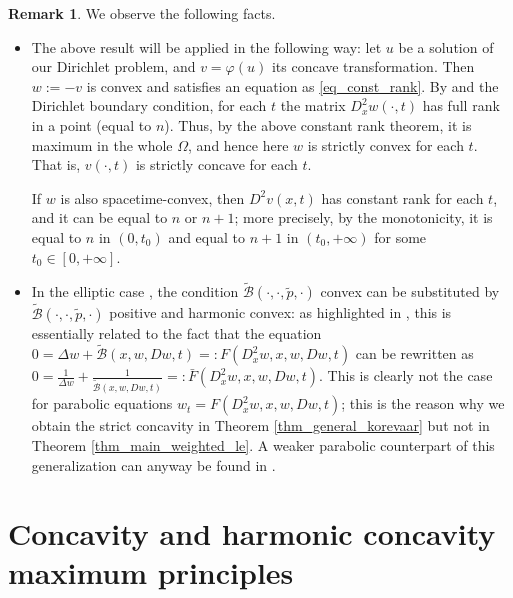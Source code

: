 \documentclass[11pt, reqno]{amsart}
\theoremstyle{definition}
\newtheorem{remark}[lemma]{Remark}
\numberwithin{equation}{section}
\newcommand{\Btilde}{\widetilde{\mathscr{B}}}
\begin{document}
\begin{remark}\label{rem_appl_const_rank}
We observe the following facts.
\begin{itemize}
\item The above result will be applied in the following way: let $u$ be a solution of our Dirichlet problem, and $v=\varphi(u)$ its concave transformation. 
Then $w:= -v$ is convex and satisfies an equation as \eqref{eq_const_rank}. By \cite[Proposition 2.6]{Gallo-Mosconi-Squassina} and the Dirichlet boundary condition, for each $t$ the matrix $D^2_x w(\cdot,t)$ has full rank in a point (equal to $n$). Thus, by the above constant rank theorem, it is maximum in the whole $\Omega$, and hence here $w$ is strictly convex for each $t$. That is, $v(\cdot, t)$ is strictly concave for each $t$.

If $w$ is also spacetime-convex, then $D^2 v(x,t)$ has constant rank for each $t$, and it can be equal to $n$ or $n+1$; more precisely, by the monotonicity, it is equal to $n$ in $(0,t_0)$ and equal to $n+1$ in $(t_0,+\infty)$ for some $t_0 \in [0,+\infty]$.

\item
In the elliptic case \cite{korevaar1987convex}, the condition $\Btilde(\cdot, \cdot, \tilde{p}, \cdot)$ convex can be substituted by $\Btilde(\cdot, \cdot, \tilde{p}, \cdot)$ positive and harmonic convex: as highlighted in \cite{BianGuan2010}, this is essentially related to the fact that the equation $0=\Delta w + \Btilde(x,w,Dw,t) =: F(D_x^2 w, x, w, Dw, t)$ can be rewritten as $0=\frac{1}{\Delta w} + \frac{1}{\Btilde(x,w,Dw,t)} =: \bar{F}(D_x^2 w, x, w, Dw, t)$. This is clearly not the case for parabolic equations $w_t =F(D_x^2 w, x, w, Dw, t)$; this is the reason why we obtain the strict concavity in Theorem \ref{thm_general_korevaar} but not in Theorem \ref{thm_main_weighted_le}. A weaker parabolic counterpart of this generalization can anyway be found in \cite[Theorem 2.3]{BianGuan2010}.
\end{itemize}
\end{remark}


\section{Concavity and harmonic concavity maximum principles}
\label{sec_concav_max_princip}
\end{document}
